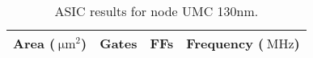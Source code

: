 %

\ifdefined\ASIC
\begin{table}[H]
\centering
\begin{tabular}{|c|c|c|c|}
\hline
\rowcolor{iob-green}
\textbf{Area} ($\SI{}{\micro\meter\squared}$)  & \textbf{Gates}  & \textbf{FFs}  & \textbf{Frequency} ($\SI{}{\mega\hertz}$)\\
\hline
\hline

\end{tabular}
\caption{ASIC results for node UMC 130nm.}
\label{tab:asic_results}
\end{table}
\fi
